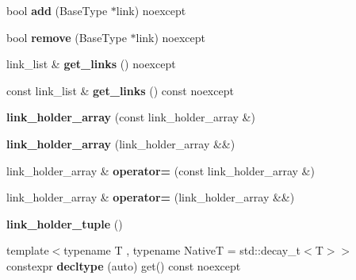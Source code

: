 \begin{CompactItemize}
\item 
\hypertarget{classhope_1_1final_5f2f7125384b9e74fc35d40afc0f8d6b}{
bool \textbf{add} (BaseType $\ast$link) noexcept}
\label{classhope_1_1final_5f2f7125384b9e74fc35d40afc0f8d6b}

\item 
\hypertarget{classhope_1_1final_dce2583efb9eb6e93ecdccd2ada2e2de}{
bool \textbf{remove} (BaseType $\ast$link) noexcept}
\label{classhope_1_1final_dce2583efb9eb6e93ecdccd2ada2e2de}

\item 
\hypertarget{classhope_1_1final_8640643d923a3f7f3083a66c2b77a280}{
link\_\-list \& \textbf{get\_\-links} () noexcept}
\label{classhope_1_1final_8640643d923a3f7f3083a66c2b77a280}

\item 
\hypertarget{classhope_1_1final_7fd4e7675820ba8da52fdcf2ddf41492}{
const link\_\-list \& \textbf{get\_\-links} () const noexcept}
\label{classhope_1_1final_7fd4e7675820ba8da52fdcf2ddf41492}

\item 
\hypertarget{classhope_1_1final_303acd0d7275ea3eb7ea8b2e9d855bed}{
\textbf{link\_\-holder\_\-array} (const link\_\-holder\_\-array \&)}
\label{classhope_1_1final_303acd0d7275ea3eb7ea8b2e9d855bed}

\item 
\hypertarget{classhope_1_1final_106655976208aa4c9c84a7151d5ce815}{
\textbf{link\_\-holder\_\-array} (link\_\-holder\_\-array \&\&)}
\label{classhope_1_1final_106655976208aa4c9c84a7151d5ce815}

\item 
\hypertarget{classhope_1_1final_49c24958cc977efdd1cbe99ba25ff7e5}{
link\_\-holder\_\-array \& \textbf{operator=} (const link\_\-holder\_\-array \&)}
\label{classhope_1_1final_49c24958cc977efdd1cbe99ba25ff7e5}

\item 
\hypertarget{classhope_1_1final_007d11c443d70a175816889e952ab072}{
link\_\-holder\_\-array \& \textbf{operator=} (link\_\-holder\_\-array \&\&)}
\label{classhope_1_1final_007d11c443d70a175816889e952ab072}

\item 
\hypertarget{classhope_1_1final_d635a46d34aa5a332d98d55c55386930}{
\textbf{link\_\-holder\_\-tuple} ()}
\label{classhope_1_1final_d635a46d34aa5a332d98d55c55386930}

\item 
\hypertarget{classhope_1_1final_7a903b6f02dbcfa1059efe99faee0ab2}{
{\footnotesize template$<$typename T , typename NativeT  = std::decay\_\-t$<$T$>$$>$ }\\constexpr \textbf{decltype} (auto) get() const noexcept}
\label{classhope_1_1final_7a903b6f02dbcfa1059efe99faee0ab2}


\end{CompactItemize}
